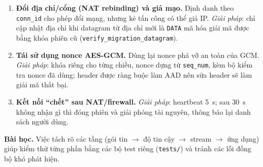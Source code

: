 \begin{enumerate}[leftmargin=*]
    \item \textbf{Đổi địa chỉ/cổng (NAT rebinding) và giả mạo.} Định danh theo \texttt{conn\_id} cho phép đổi mạng, nhưng kẻ tấn công có thể giả IP. \emph{Giải pháp}: chỉ cập nhật địa chỉ khi datagram từ địa chỉ mới là \texttt{DATA} mã hóa giải mã được bằng khóa phiên cũ (\texttt{verify\_migration\_datagram}).

    \item \textbf{Tái sử dụng nonce AES-GCM.} Dùng lại nonce phá vỡ an toàn của GCM. \emph{Giải pháp}: khóa riêng cho từng chiều, nonce dựng từ \texttt{seq\_num}, kèm bộ kiểm tra nonce đã dùng; header được ràng buộc làm AAD nên sửa header sẽ làm giải mã thất bại.

    \item \textbf{Kết nối ``chết'' sau NAT/firewall.} \emph{Giải pháp}: heartbeat 5~s; sau 30~s không nhận gì thì đóng phiên và giải phóng tài nguyên, thông báo lại danh sách người dùng.
\end{enumerate}

\textbf{Bài học.} Việc tách rõ các tầng (gói tin $\rightarrow$ độ tin cậy $\rightarrow$ stream $\rightarrow$ ứng dụng) giúp kiểm thử từng phần bằng các bộ test riêng (\texttt{tests/}) và tránh các lỗi đồng bộ khó phát hiện.
